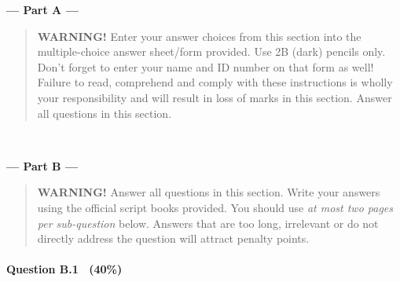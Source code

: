 \documentclass[12pt,fleqn,a4paper]{article}
\begin{document}
    



    \newpage

    \begin{center}
        {\Large\bfseries{--- Part A ---}}

        \begin{quote}
            \textbf{WARNING!} Enter your answer choices from this section into the multiple-choice answer sheet/form provided. Use 2B (dark) pencils only. Don't forget to enter your name and ID number on that form as well! Failure to read, comprehend and comply with these instructions is wholly your responsibility and will result in loss of marks in this section. Answer all questions in this section.
        \end{quote}
    \end{center}

        \begin{verbatim}
            
        \end{verbatim}

    

    \newpage
    \begin{center}
        {\Large\bfseries{--- Part B ---}}

        \begin{quote}
            \textbf{WARNING!} Answer all questions in this section. Write your answers using the official script books provided. You should use \emph{at most two pages per sub-question} below. Answers that are too long, irrelevant or do not directly address the question will attract penalty points.
        \end{quote}

    \end{center}

    \renewcommand{\thesection}{B}
    \setcounter{equation}{0}

		\paragraph{\textbf{Question \thesection.1 \ (40\%)}}
\end{document}
